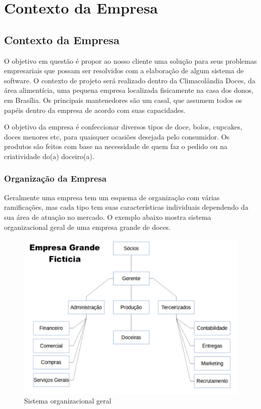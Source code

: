 \part{Contexto da Empresa}

\chapter[Contexto da Empresa]{Contexto da Empresa}

O objetivo em questão é propor ao nosso cliente uma solução para seus problemas empresariais que possam ser resolvidos com a elaboração de algum sistema de software. O contexto de projeto será realizado dentro da Climacolândia Doces, da área alimentícia, uma pequena empresa localizada fisicamente na casa dos donos, em Brasília. Os principais mantenedores são um casal, que assumem todos os papéis dentro da empresa de acordo com suas capacidades.

O objetivo da empresa é confeccionar diversos tipos de doce, bolos, cupcakes, doces menores etc, para quaisquer ocasiões desejada pelo consumidor. Os produtos são feitos com base na necessidade de quem faz o pedido ou na criatividade do(a) doceiro(a).


\section{Organização da Empresa}

Geralmente uma empresa tem um esquema de organização com várias ramificações, mas cada tipo tem suas características individuais dependendo da sua área de atuação no mercado. O exemplo abaixo mostra sistema organizacional geral de uma empresa grande de doces.

\begin{figure}[h!]
	\centering
	\includegraphics[scale=0.7]{figuras/grande.png}
	\caption{Sistema organizacional geral}
\end{figure}


